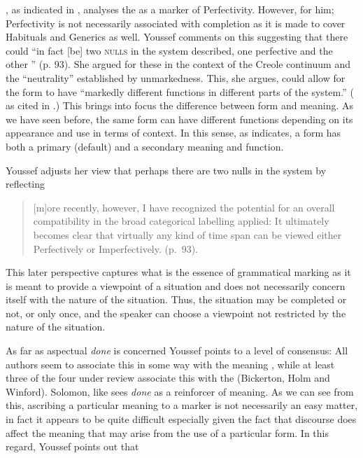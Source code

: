 \citet{Winford1993}, as indicated in , analyses the
 as a marker of Perfectivity.  However, for him;
Perfectivity is not necessarily associated with completion as it is
made to cover Habituals and Generics as well.  Youssef comments on
this suggesting that there could ``in fact [be] two \textsc{nulls} in the system
described, one perfective and the other ” (p.  93).  She
argued for these in the context of the Creole continuum and the
``neutrality'' established by unmarkedness.  This, she argues, could
allow for the form to have ``markedly different functions in different
parts of the system.”  (\citealt{Youssef1995} as cited in \citealt[93]{Youssef2003}.)
This brings into focus the difference between form and
meaning.  As we have seen before, the same form can have different
functions depending on its appearance and use in terms of context.  In
this sense, as \citet{Winford1993} indicates, a form has both a
primary (default) and a secondary meaning and function.

Youssef adjusts her view that perhaps there are two nulls in the
system by reflecting

\begin{quote}
[m]ore recently, however, I have recognized the potential for an
overall compatibility in the broad categorical labelling applied: It
ultimately becomes clear that virtually any kind of time span can be
viewed either Perfectively or Imperfectively. (p.~93).
\end{quote}

This later perspective captures what is the essence of grammatical
marking as it is meant to provide a viewpoint of a situation and does
not necessarily concern itself with the nature of the situation. Thus,
the situation may be completed or not,  or only once, and the
speaker can choose a viewpoint not restricted by the nature of the
situation.

As far as aspectual \textit{done} is concerned Youssef points to a
level of consensus: All authors seem to associate this in some way
with the meaning , while at least three of the four under
review associate this with the  (Bickerton, Holm and Winford).
Solomon, like \citet{Alleyne1980} sees \textit{done} as a reinforcer
of  meaning.  As we can see from this, ascribing a
particular meaning to a marker is not necessarily an easy matter, in
fact it appears to be quite difficult especially given the fact that
discourse does affect the meaning that may arise from the use of a
particular form.  In this regard, Youssef points out that

